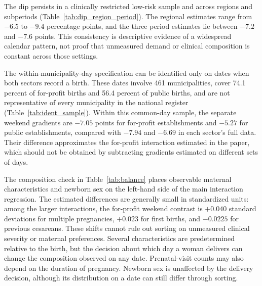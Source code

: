 

The dip persists in a clinically restricted low-risk sample and across regions and
subperiods (Table~\ref{tab:dip_region_period}). The regional estimates range from
$-6.5$ to $-9.4$ percentage points, and the three period estimates lie between
$-7.2$ and $-7.6$ points. This consistency is descriptive evidence of a widespread
calendar pattern, not proof that unmeasured demand or clinical composition is
constant across those settings.


\FloatBarrier

The within-municipality-day specification can be identified only on dates when
both sectors record a birth. These dates involve 461 municipalities, cover 74.1
percent of for-profit births and 56.4 percent of public births, and are not
representative of every municipality in the national register
(Table~\ref{tab:ident_sample}). Within this common-day sample, the separate
weekend gradients are $-7.05$ points for for-profit establishments and $-5.27$ for
public establishments, compared with $-7.94$ and $-6.69$ in each sector's full
data. Their difference approximates the for-profit interaction estimated in the
paper, which should not be obtained by subtracting gradients estimated on
different sets of days.



The composition check in Table~\ref{tab:balance} places observable maternal
characteristics and newborn sex on the left-hand side of the main interaction
regression. The estimated differences are generally small in standardized units:
among the larger interactions, the for-profit weekend contrast is $+0.040$
standard deviations for multiple pregnancies, $+0.023$ for first births, and
$-0.0225$ for previous cesareans. These shifts cannot rule out sorting on
unmeasured clinical severity or maternal preferences. Several characteristics are
predetermined relative to the birth, but the decision about which day a woman
delivers can change the composition observed on any date. Prenatal-visit counts
may also depend on the duration of pregnancy. Newborn sex is unaffected by the
delivery decision, although its distribution on a date can still differ through
sorting.

